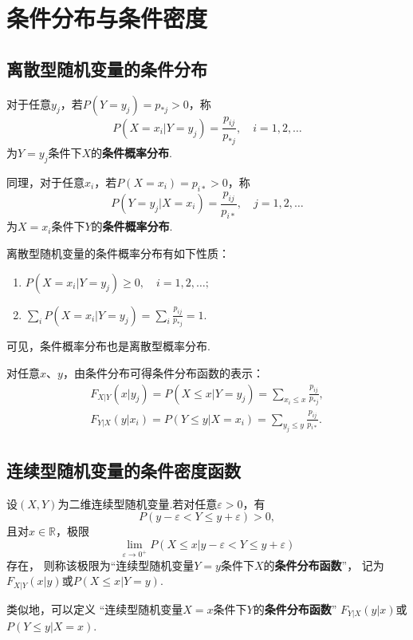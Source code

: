 \section{条件分布与条件密度}
\subsection{离散型随机变量的条件分布}
\begin{definition}
对于任意\(y_j\)，若\(P(Y=y_j) = p_{*j} > 0\)，称\[
P(X=x_i \vert Y=y_j) = \frac{p_{ij}}{p_{*j}}, \quad i=1,2,\dotsc
\]为\(Y=y_j\)条件下\(X\)的\textbf{条件概率分布}.

同理，对于任意\(x_i\)，若\(P(X=x_i) = p_{i*} > 0\)，称\[
P(Y=y_j \vert X=x_i) = \frac{p_{ij}}{p_{i*}}, \quad j=1,2,\dotsc
\]为\(X=x_i\)条件下\(Y\)的\textbf{条件概率分布}.
\end{definition}

\begin{property}
离散型随机变量的条件概率分布有如下性质：
\begin{enumerate}
\item \(P(X=x_i \vert Y=y_j) \geqslant 0, \quad i=1,2,\dotsc;\)
\item \(\sum_{i}{P(X=x_i \vert Y=y_j)} = \sum_{i}{\frac{p_{ij}}{p_{*j}}} = 1.\)
\end{enumerate}
可见，条件概率分布也是离散型概率分布.
\end{property}

\begin{theorem}
对任意\(x\)、\(y\)，由条件分布可得条件分布函数的表示：
\begin{align*}
F_{X \vert Y}(x \vert y_j) = P(X \leqslant x \vert Y=y_j) = \sum_{x_i \leqslant x}{\frac{p_{ij}}{p_{*j}}}, \\
F_{Y \vert X}(y \vert x_i) = P(Y \leqslant y \vert X=x_i) = \sum_{y_j \leqslant y}{\frac{p_{ij}}{p_{i*}}}.
\end{align*}
\end{theorem}

\subsection{连续型随机变量的条件密度函数}
\begin{definition}
设\((X,Y)\)为二维连续型随机变量.若对任意\(\varepsilon > 0\)，有\[
P(y - \varepsilon < Y \leqslant y + \varepsilon) > 0,
\]且对\(x\in\mathbb{R}\)，极限\[
\lim\limits_{\varepsilon\to0^+} P(X \leqslant x \vert y - \varepsilon < Y \leqslant y + \varepsilon)
\]存在，%
则称该极限为“连续型随机变量\(Y=y\)条件下\(X\)的\textbf{条件分布函数}”，%
记为\(F_{X \vert Y}(x \vert y)\)或\(P(X \leqslant x \vert Y = y)\).

类似地，可以定义%
“连续型随机变量\(X=x\)条件下\(Y\)的\textbf{条件分布函数}”%
\(F_{Y \vert X}(y \vert x)\)或\(P(Y \leqslant y \vert X = x)\).
\end{definition}

